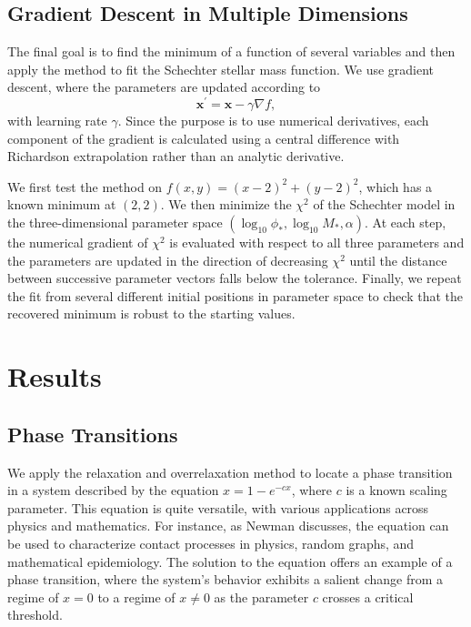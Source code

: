 \documentclass[a4paper,11pt]{article}
\begin{document}
\subsection{Gradient Descent in Multiple Dimensions}

The final goal is to find the minimum of a function of several variables and then apply the method to fit the Schechter stellar mass function. We use gradient descent, where the parameters are updated according to $$\mathbf{x}^\prime=\mathbf{x}-\gamma\nabla f,$$ with learning rate $\gamma$. Since the purpose is to use numerical derivatives, each component of the gradient is calculated using a central difference with Richardson extrapolation rather than an analytic derivative.

We first test the method on $f(x,y)=(x-2)^2+(y-2)^2$, which has a known minimum at $(2,2)$. We then minimize the $\chi^2$ of the Schechter model in the three-dimensional parameter space $(\log_{10}\phi_*,\log_{10}M_*,\alpha)$. At each step, the numerical gradient of $\chi^2$ is evaluated with respect to all three parameters and the parameters are updated in the direction of decreasing $\chi^2$ until the distance between successive parameter vectors falls below the tolerance. Finally, we repeat the fit from several different initial positions in parameter space to check that the recovered minimum is robust to the starting values.
\section*{Results}

\subsection*{Phase Transitions}

We apply the relaxation and overrelaxation method to locate a phase transition in a system described by the equation $x = 1 - e^{-cx}$, where $c$ is a known scaling parameter. This equation is quite versatile, with various applications across physics and mathematics. For instance, as Newman discusses, the equation can be used to characterize contact processes in physics, random graphs, and mathematical epidemiology. The solution to the equation offers an example of a phase transition, where the system's behavior exhibits a salient change from a regime of $x=0$ to a regime of $x\neq 0$ as the parameter $c$ crosses a critical threshold. 
\end{document}
